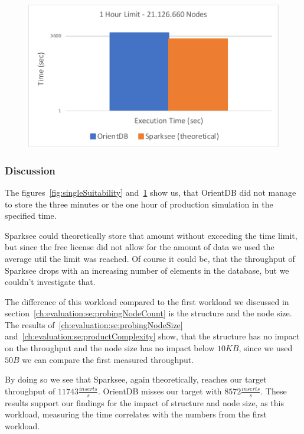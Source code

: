 \begin{figure}[h!]
  \centering
  \includegraphics[width=.75\textwidth]{images/production/hourSuitability}
  \label{fig:hourSuitability}
\end{figure}

\subsubsection{Discussion}
\label{ch:evaluation:se:suitabilityDiscussion}
The figures~\ref{fig:singleSuitability} and~\ref{fig:hourSuitability} show us,
that OrientDB did not manage to store the three minutes or the one hour of production simulation in the specified time.

Sparksee could theoretically store that amount without exceeding the time limit,
but since the free license did not allow for the amount of data we used the average util the limit was reached.
Of course it could be,
that the throughput of Sparksee drops with an increasing number of elements in the database,
but we couldn't investigate that.

The difference of this workload compared to the first workload we discussed in section~\ref{ch:evaluation:se:probingNodeCount} is the structure and the node size.
The results of~\ref{ch:evaluation:se:probingNodeSize} and~\ref{ch:evaluation:se:productComplexity} show,
that the structure has no impact on the throughput and the node size has no impact below $ 10KB $,
since we used $ 50B $ we can compare the first measured throughput.

By doing so we see that Sparksee,
again theoretically,
reaches our target throughput of $ 11743 \frac{inserts}{s} $.
OrientDB misses our target with $ 8572 \frac{inserts}{s} $.
These results support our findings for the impact of structure and node size,
as this workload,
measuring the time correlates with the numbers from the first workload.

